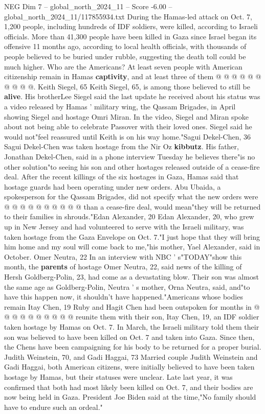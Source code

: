 \begin{textsample}{NEG Dim 7 – global\_north\_2024\_11 – Score -6.00 – global\_north\_2024\_11/117855934.txt}
During the Hamas-led attack on Oct. 7, 1,200 people, including hundreds of IDF soldiers, were killed, according to Israeli officials.
More than 41,300 people have been killed in Gaza since Israel began its offensive 11 months ago, according to local health officials, with thousands of people believed to be buried under rubble, suggesting the death toll could be much higher.
Who are the Americans?
At least seven people with American citizenship remain in Hamas \textbf{captivity}, and at least three of them @ @ @ @ @ @ @ @ @ @.
Keith Siegel, 65 Keith Siegel, 65, is among those believed to still be \textbf{alive}.
His brotherLee Siegel said the last update he received about his status was a video released by Hamas ' military wing, the Qassam Brigades, in April showing Siegel and hostage Omri Miran.
In the video, Siegel and Miran spoke about not being able to celebrate Passover with their loved ones.
Siegel said he would not"feel reassured until Keith is on his way home."Sagui Dekel-Chen, 36 Sagui Dekel-Chen was taken hostage from the Nir Oz \textbf{kibbutz}.
His father, Jonathan Dekel-Chen, said in a phone interview Tuesday he believes there"is no other solution"to seeing his son and other hostages released outside of a cease-fire deal.
After the recent killings of the six hostages in Gaza, Hamas said that hostage guards had been operating under new orders.
Abu Ubaida, a spokesperson for the Qassam Brigades, did not specify what the new orders were @ @ @ @ @ @ @ @ @ @ than a cease-fire deal, would mean"they will be returned to their families in shrouds."Edan Alexander, 20 Edan Alexander, 20, who grew up in New Jersey and had volunteered to serve with the Israeli military, was taken hostage from the Gaza Envelope on Oct. 7."I just hope that they will bring him home and my soul will come back to me,"his mother, Yael Alexander, said in October.
Omer Neutra, 22 In an interview with NBC ' s"TODAY"show this month, the \textbf{parents} of hostage Omer Neutra, 22, said news of the killing of Hersh Goldberg-Polin, 23, had come as a devastating blow.
Their son was almost the same age as Goldberg-Polin, Neutra ' s mother, Orna Neutra, said, and"to have this happen now, it shouldn't have happened."Americans whose bodies remain Itay Chen, 19 Ruby and Hagit Chen had been outspoken for months in @ @ @ @ @ @ @ @ @ @ reunite them with their son, Itay Chen, 19, an IDF soldier taken hostage by Hamas on Oct. 7.
In March, the Israeli military told them their son was believed to have been killed on Oct. 7 and taken into Gaza.
Since then, the Chens have been campaigning for his body to be returned for a proper burial.
Judith Weinstein, 70, and Gadi Haggai, 73 Married couple Judith Weinstein and Gadi Haggai, both American citizens, were initially believed to have been taken hostage by Hamas, but their statuses were unclear.
Late last year, it was confirmed that both had most likely been killed on Oct. 7, and their bodies are now being held in Gaza.
President Joe Biden said at the time,"No family should have to endure such an ordeal."

\end{textsample}
